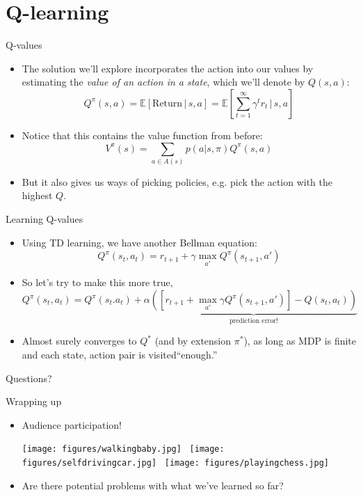 \documentclass{beamer}
\newcommand{\E}[1]{\mathbb{E}\left[#1\right]}
\begin{document}
\section{Q-learning}


\begin{frame}{Q-values}
\begin{itemize}
\item The solution we'll explore incorporates the action into our values by estimating the \emph{value of an action in a state}, which we'll denote by \(Q(s,a)\):
    \[Q^\pi(s,a) = \E{\text{Return} \, |\, s, a} = \E{\sum_{t=1}^\infty \gamma^t r_t \, \bigg \vert \, s, a } \]
\item<2-> Notice that this contains the value function from before:
    \[V^\pi(s) = \sum_{a \in A(s)} p(a | s, \pi) Q^{\pi} (s, a)\]
\item<3-> But it also gives us ways of picking policies, e.g. pick the action with the highest \(Q\).
\end{itemize}
\end{frame}

\begin{frame}{Learning Q-values}
\begin{itemize}
    \item<1-> Using TD learning, we have another Bellman equation:
        \[Q^{\pi}\left(s_{t}, a_t\right) = r_{t+1} + \gamma \max_{a'} Q^{\pi}\left(s_{t+1}, a'\right) \] 
    \item<2-> So let's try to make this more true, 
        {\small
        \[Q^{\pi}(s_{t}, a_t) = Q^{\pi}(s_t. a_t) + \alpha \underbrace{\left( \left[ r_{t+1} + \max_{a'} \gamma Q^{\pi}(s_{t+1}, a') \right] - Q(s_t, a_t)\right)}_{\text{prediction error!}}\]}
    \item<3-> Almost surely converges to \(Q^*\) (and by extension \(\pi^*\)), as long as MDP is finite and each state, action pair is visited``enough.'' 
\end{itemize}
\end{frame}

\begin{frame}[standout]
Questions?
\end{frame}

\begin{frame}{Wrapping up}
\begin{itemize}
    \item Audience participation!
    \begin{center}
        \texttt{[image: figures/walkingbaby.jpg]}~
        \texttt{[image: figures/selfdrivingcar.jpg]}~
        \texttt{[image: figures/playingchess.jpg]}
    \end{center}
    \item<2-> Are there potential problems with what we've learned so far?
    
\end{itemize}
\end{frame}
\end{document}
